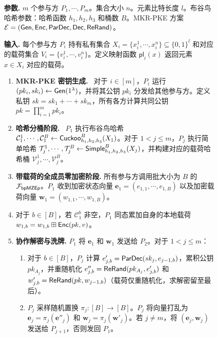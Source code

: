 \begin{figure}[!htb]
\begin{framed}
\begin{minipage}[c]{\textwidth}
\begin{trivlist}
\item \textbf{参数.} $m$ 个参与方 $P_1, \cdots, P_m$。集合大小 $n$。元素比特长度 $l$。布谷鸟哈希参数：哈希函数 $h_1, h_2, h_3$ 和桶数 $B$。MKR-PKE 方案 $\mathcal{E} = (\mathsf{Gen}, \mathsf{Enc}, \mathsf{ParDec}, \mathsf{Dec}, \mathsf{ReRand})$。
\item \textbf{输入.} 每个参与方 $P_i$ 持有私有集合 $X_i = \{x_i^1,\cdots, x_i^n\} \subseteq \{0,1\}^l$ 和对应的载荷集合 $V_i = \{v_i^1,\cdots, v_i^n\}$。定义映射函数 $\mathsf{pl}_i(x)$ 返回元素 $x \in X_i$ 对应的载荷。
\begin{enumerate}[itemsep=2pt,topsep=0pt,parsep=0pt]
    \item \textbf{MKR-PKE 密钥生成.}~\label{step:key-gen} 对于 $i \in [m]$，$P_i$ 运行 $(pk_i, sk_i) \gets \mathsf{Gen}(1^\lambda)$，并将其公钥 $pk_i$ 分发给其他参与方。定义私钥 $sk = sk_1 + \cdots + sk_m$，所有各方计算共同公钥 $pk= \prod_{i =1}^m pk_i$。
    \item \textbf{哈希分桶阶段.}~\label{step:hash} $P_1$ 执行布谷鸟哈希 $\mathcal{C}_1^1, \cdots, \mathcal{C}_1^B \gets \mathsf{Cuckoo}_{h_1,h_2,h_3}^B(X_1)$。对于 $1 < j  \le m$，$P_j$ 执行简单哈希 $\mathcal{T}_j^1, \cdots, \mathcal{T}_j^B \gets \mathsf{Simple}_{h_1,h_2,h_3}^B(X_j)$，并构建对应的载荷哈希桶 $\mathcal{V}_j^1, \cdots, \mathcal{V}_j^B$。
    \item \textbf{带载荷的全成员零加密阶段.} 所有参与方调用批大小为 $B$ 的 $\mathcal{F}_\mathsf{bpMZEp}$。$P_1$ 收到加密状态向量 $\textbf{e}_1=(e_{1,1},\cdots,e_{1,B})$ 以及加密载荷向量 $\textbf{w}_1=(w_{1,1},\cdots,w_{1,B})$。
    \item 对于 $b \in [B]$，若 $\mathcal{C}_1^b$ 非空，$P_1$ 同态累加自身的本地载荷 $w_{1,b} = w_{1,b} \boxplus \mathsf{Enc}(pk,v)$。
    \item \textbf{协作解密与洗牌.} $P_1$ 将 $\textbf{e}_1$ 和 $\textbf{w}_1$ 发送给 $P_{2}$。对于 $1 < j \le m$： 
        \begin{enumerate}[itemsep=2pt,topsep=0pt,parsep=0pt]
        \item 对于 $b \in [B]$，$P_j$ 计算 $e'_{j,b} = \mathsf{ParDec}(sk_j,e_{j-1,b})$，累积公钥 $pk_{A_j}$，并重随机化 $e''_{j,b} = \mathsf{ReRand}(pk_{A_j},e'_{j,b})$ 和 $w'_{j,b} = \mathsf{ReRand}(pk,w_{j-1,b})$（载荷仅重随机化，求解密留至最后）。 
        \item $P_j$ 采样随机置换 $\pi_j:[B] \to [B]$。$P_j$ 将向量打乱为 $\textbf{e}_{j} = {\pi_j}(\textbf{e}''_{j})$ 和 $\textbf{w}_{j} = {\pi_j}(\textbf{w}'_{j})$。若 $j \ne m$，将 $(\textbf{e}_{j}, \textbf{w}_{j})$ 发送给 $P_{j+1}$，否则发回 $P_{1}$。

\end{enumerate}
\end{enumerate}
\end{trivlist}
\end{minipage}
\end{framed}
\end{figure}

